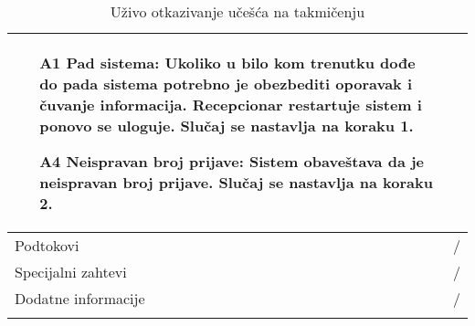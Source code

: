 \documentclass[../../main.tex]{subfiles}
\begin{document}
\begin{longtable}{| p{} | p{} |}
\begin{itemize}
        \item[A1] Pad sistema: Ukoliko u bilo kom trenutku dođe do pada sistema potrebno je obezbediti oporavak i čuvanje informacija. Recepcionar restartuje sistem i ponovo se uloguje. Slučaj se nastavlja na koraku 1.
        \item[A4] Neispravan broj prijave: Sistem obaveštava da je neispravan broj prijave. Slučaj se nastavlja na koraku 2.
    \end{itemize}\\
\hline
    Podtokovi & /\\
\hline
    Specijalni zahtevi & /\\
\hline
    Dodatne informacije & /\\
\hline
\caption{Uživo otkazivanje učešća na takmičenju} %
\end{longtable}
\end{document}
